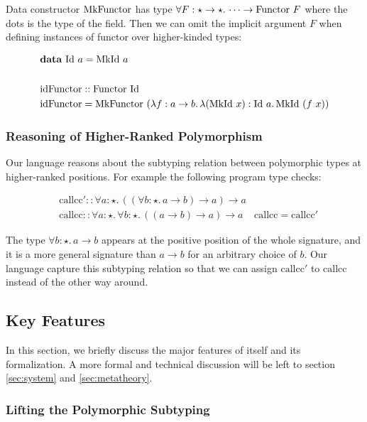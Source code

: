Data constructor $\mathrm{MkFunctor}$ has type $\forall F : \star \rightarrow \star.\, \dots \rightarrow \mathrm{Functor}~F$ where the dots is the type of the field.
Then we can omit the implicit argument $F$ when defining instances of functor over higher-kinded types:

\begin{align*}
  & \mathbf{data}~\mathrm{Id}~a=\mathrm{MkId}~a \\
  \\
  & \mathrm{idFunctor} :: \mathrm{Functor}~\mathrm{Id} \\
  & \mathrm{idFunctor} = \mathrm{MkFunctor}~(\lambda f : a \rightarrow b.\, \lambda (\mathrm{MkId}~x) : \mathrm{Id}~a.\, \mathrm{MkId}~(f~x))
\end{align*}

\subsubsection{Reasoning of Higher-Ranked Polymorphism}
\label{sec:higher-ranked-poly}

Our language reasons about the subtyping relation between polymorphic types at
higher-ranked positions. For example the following program type checks:

\begin{align*}
& \mathrm{callcc}' :: \forall a : \star.\, ((\forall b : \star.\, a \rightarrow b) \rightarrow a) \rightarrow a
\\
& \mathrm{callcc} :: \forall a : \star.\, \forall b : \star.\, ((a \rightarrow b) \rightarrow a) \rightarrow a
& \mathrm{callcc} = \mathrm{callcc}'
\end{align*}

The type $\forall b : \star.\, a \rightarrow b$ appears at the positive position
of the whole signature, and it is a more general signature than $a \rightarrow b$
for an arbitrary choice of $b$. Our language capture this subtyping relation so that
 we can assign $\mathrm{callcc}'$ to $\mathrm{callcc}$ instead of the other way around.

\subsection{Key Features}

In this section, we briefly discuss the major features of \name itself and
its formalization. A more formal and technical discussion will be left to
section \ref{sec:system} and \ref{sec:metatheory}.

\subsubsection{Lifting the Polymorphic Subtyping}
\label{sec:polymorphic-subtyping}

